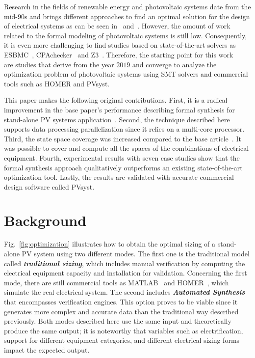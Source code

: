 \documentclass[journal]{IEEEtran}
\begin{document}
Research in the fields of renewable energy and photovoltaic systems date from the mid-90s and brings different approaches to find an optimal solution for the design of electrical systems as can be seen in~\cite{Driouich2018} and~\cite{Applasamy2011}. However, the amount of work related to the formal modeling of photovoltaic systems is still low. Consequently, it is even more challenging to find studies based on state-of-the-art solvers as ESBMC~\cite{esbmc2018}, CPAchecker~\cite{Beyer2011} and Z3~\cite{BjornerPF15}. Therefore, the starting point for this work~\cite{VSTTE2020}~\cite{TrindadeCordeiro19}~\cite{AraujoBCF16} are studies that derive from the year $2019$ and converge to analyze the optimization problem of photovoltaic systems using SMT solvers and commercial tools such as HOMER and PVsyst. 

This paper makes the following original contributions. First, it is a radical improvement in the base paper's performance describing formal synthesis for stand-alone PV systems application~\cite{DBLP:journals/corr/abs-1909-13139}. Second, the technique described here supports data processing parallelization since it relies on a multi-core processor. Third, the state space coverage was increased compared to the base article~\cite{VSTTE2020}. It was possible to cover and compute all the spaces of the combinations of electrical equipment. Fourth, experimental results with seven case studies show that the formal synthesis approach qualitatively outperforms an existing state-of-the-art optimization tool. Lastly, the results are validated with accurate commercial design software called PVsyst.


\section{Background}
\label{sec:AutomatedVerification}
 
Fig.~\ref{fig:optimization} illustrates how to obtain the optimal sizing of a stand-alone PV system using two different modes. The first one is the traditional model called \textit{\textbf{traditional sizing}}, which includes manual verification by computing the electrical equipment capacity and installation for validation. Concerning the first mode, there are still commercial tools as MATLAB~\cite{Benatiallah2017} and HOMER~\cite{Pradhan,Swarnkar}, which simulate the real electrical system. The second includes \textbf{\textit{Automated Synthesis}} that encompasses verification engines. This option proves to be viable since it generates more complex and accurate data than the traditional way described previously. Both modes described here use the same input and theoretically produce the same output; it is noteworthy that variables such as electrification, support for different equipment categories, and different electrical sizing forms impact the expected output.
\end{document}
